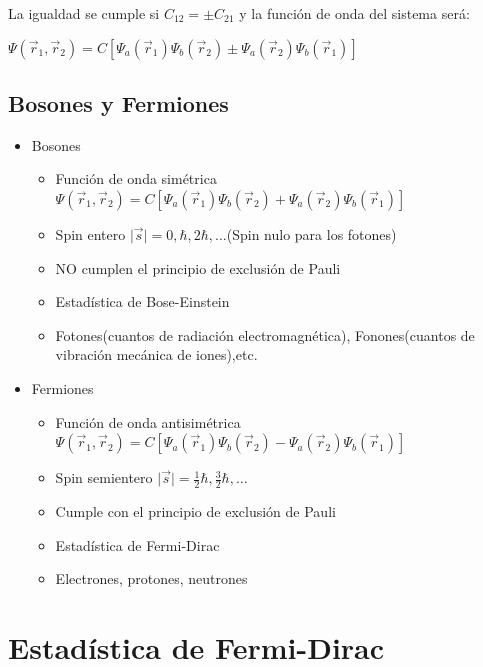 \documentclass[oneside]{book}
\numberwithin{equation}{section}
\numberwithin{figure}{section}
\numberwithin{table}{section}
\begin{document}
					La igualdad se cumple si $C_{12}=\pm C_{21}$ y la función de onda del sistema será:\\
					
					\begin{center}
						$\displaystyle  \Psi(\vec{r}_1,\vec{r}_2)=C\left[\Psi_a(\vec{r}_1)\Psi_b(\vec{r}_2) \pm \Psi_a(\vec{r}_2)\Psi_b(\vec{r}_1)\right]$
					\end{center}			
				
				\subsection{Bosones y Fermiones}
				
					\begin{itemize}
						\item Bosones
							\begin{itemize}
								\item Función de onda simétrica $\displaystyle  \Psi(\vec{r}_1,\vec{r}_2)=C\left[\Psi_a(\vec{r}_1)\Psi_b(\vec{r}_2) + \Psi_a(\vec{r}_2)\Psi_b(\vec{r}_1)\right]$
								\item Spin entero $\displaystyle \vert \vec{s} \vert=0,\hbar,2\hbar,\ldots $(Spin nulo para los fotones)
								\item NO cumplen el principio de exclusión de Pauli
								\item Estadística de Bose-Einstein
								\item Fotones(cuantos de radiación electromagnética), Fonones(cuantos de vibración mecánica de iones),etc.
							\end{itemize}
						\item Fermiones
							\begin{itemize}
								\item Función de onda antisimétrica $\displaystyle  \Psi(\vec{r}_1,\vec{r}_2)=C\left[\Psi_a(\vec{r}_1)\Psi_b(\vec{r}_2) - \Psi_a(\vec{r}_2)\Psi_b(\vec{r}_1)\right]$
								\item Spin semientero $\displaystyle \vert \vec{s} \vert=\frac{1}{2}\hbar,\frac{3}{2}\hbar,\ldots $
								\item Cumple con el principio de exclusión de Pauli
								\item Estadística de Fermi-Dirac
								\item Electrones, protones, neutrones
							\end{itemize}
					\end{itemize}									
				
		\section{Estadística de Fermi-Dirac}
		
\end{document}
